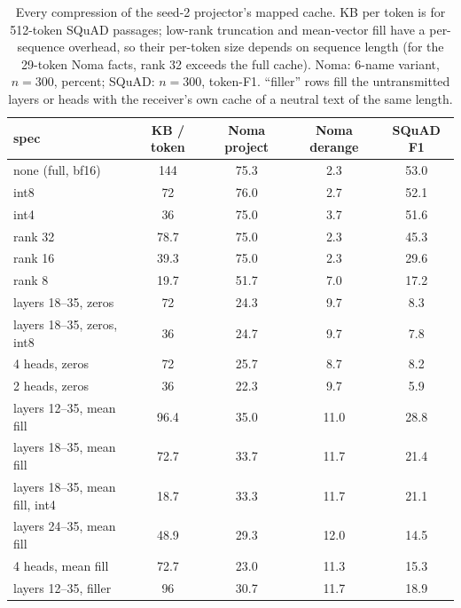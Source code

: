\documentclass{article}
\begin{document}
\begin{table}[h]
\caption{Every compression of the seed-2 projector's mapped cache. KB per token is for 512-token SQuAD passages; low-rank truncation and mean-vector fill have a per-sequence overhead, so their per-token size depends on sequence length (for the 29-token Noma facts, rank 32 exceeds the full cache). Noma: 6-name variant, $n = 300$, percent; SQuAD: $n = 300$, token-F1. ``filler'' rows fill the untransmitted layers or heads with the receiver's own cache of a neutral text of the same length.}
\label{tab:compress}
\vskip 0.1in
\begin{center}
\begin{small}
\begin{tabular}{lcccc}
\toprule
spec & KB / token & Noma project & Noma derange & SQuAD F1 \\
\midrule
none (full, bf16)                       & 144  & 75.3 & 2.3  & 53.0 \\
int8                                    & 72   & 76.0 & 2.7  & 52.1 \\
int4                                    & 36   & 75.0 & 3.7  & 51.6 \\
rank 32                                 & 78.7 & 75.0 & 2.3  & 45.3 \\
rank 16                                 & 39.3 & 75.0 & 2.3  & 29.6 \\
rank 8                                  & 19.7 & 51.7 & 7.0  & 17.2 \\
layers 18--35, zeros                    & 72   & 24.3 & 9.7  & 8.3 \\
layers 18--35, zeros, int8              & 36   & 24.7 & 9.7  & 7.8 \\
4 heads, zeros                          & 72   & 25.7 & 8.7  & 8.2 \\
2 heads, zeros                          & 36   & 22.3 & 9.7  & 5.9 \\
layers 12--35, mean fill                & 96.4 & 35.0 & 11.0 & 28.8 \\
layers 18--35, mean fill                & 72.7 & 33.7 & 11.7 & 21.4 \\
layers 18--35, mean fill, int4          & 18.7 & 33.3 & 11.7 & 21.1 \\
layers 24--35, mean fill                & 48.9 & 29.3 & 12.0 & 14.5 \\
4 heads, mean fill                      & 72.7 & 23.0 & 11.3 & 15.3 \\
layers 12--35, filler                   & 96   & 30.7 & 11.7 & 18.9 \\

\end{tabular}
\end{small}
\end{center}
\end{table}
\end{document}
